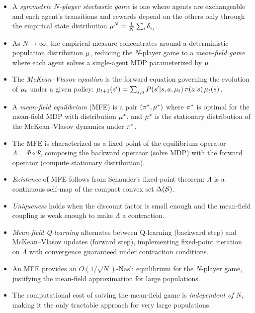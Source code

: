 \documentclass[11pt,a4paper]{article}
\begin{document}
\begin{itemize}
  \item A \emph{symmetric $N$-player stochastic game} is one where
    agents are exchangeable and each agent's transitions and rewards
    depend on the others only through the empirical state
    distribution $\mu^N = \frac{1}{N}\sum_i \delta_{s_i}$.

  \item As $N \to \infty$, the empirical measure concentrates
    around a deterministic population distribution $\mu$,
    reducing the $N$-player game to a \emph{mean-field game} where
    each agent solves a single-agent MDP parameterized by
    $\mu$.

  \item The \emph{McKean--Vlasov equation} is the forward equation
    governing the evolution of $\mu_t$ under a given policy:
    $\mu_{t+1}(s') = \sum_{s,a} P(s'|s,a,\mu_t)\,
    \pi(a|s)\, \mu_t(s)$.

  \item A \emph{mean-field equilibrium} (MFE) is a pair $(\pi^*,
    \mu^*)$ where $\pi^*$ is optimal for the mean-field
    MDP with distribution $\mu^*$, and $\mu^*$ is the
    stationary distribution of the McKean--Vlasov dynamics under
    $\pi^*$.

  \item The MFE is characterized as a fixed point of the equilibrium
    operator $\Lambda = \Phi \circ \Psi$, composing the backward
    operator (solve MDP) with the forward operator (compute
    stationary distribution).

  \item \emph{Existence} of MFE follows from Schauder's fixed-point
    theorem: $\Lambda$ is a continuous self-map of the compact
    convex set $\Delta(\mathcal{S})$.

  \item \emph{Uniqueness} holds when the discount factor is small
    enough and the mean-field coupling is weak enough to make
    $\Lambda$ a contraction.

  \item \emph{Mean-field Q-learning} alternates between Q-learning
    (backward step) and McKean--Vlasov updates (forward step),
    implementing fixed-point iteration on $\Lambda$ with convergence
    guaranteed under contraction conditions.

  \item An MFE provides an $O(1/\sqrt{N})$-Nash equilibrium for the
    $N$-player game, justifying the mean-field approximation for
    large populations.

  \item The computational cost of solving the mean-field game is
    \emph{independent of $N$}, making it the only tractable approach
    for very large populations.
\end{itemize}
\end{document}
